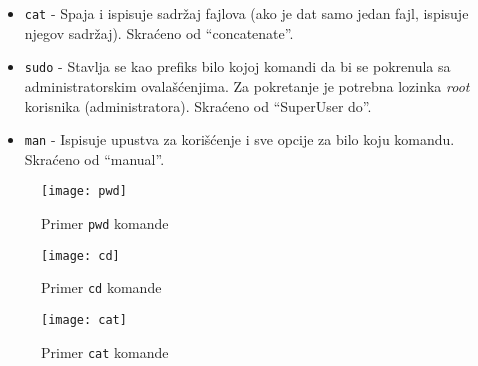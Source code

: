 \begin{itemize}
\item \texttt{cat} 	- Spaja i ispisuje sadržaj fajlova (ako je dat samo jedan fajl, ispisuje njegov sadržaj). Skraćeno od ``concatenate''.

\item \texttt{sudo} - Stavlja se kao prefiks bilo kojoj komandi da bi se pokrenula sa administratorskim ovalašćenjima. Za pokretanje je potrebna lozinka \textit{root} korisnika (administratora). Skraćeno od ``SuperUser do''.

\item \texttt{man} - Ispisuje upustva za korišćenje i sve opcije za bilo koju komandu. Skraćeno od ``manual''.
\end{itemize}
\begin{figure}[H]
	\centering
	\texttt{[image: pwd]}
	\caption{Primer \texttt{pwd} komande}
\end{figure}
\begin{figure}[H]
	\centering
	\texttt{[image: cd]}
	\caption{Primer \texttt{cd} komande}
\end{figure}
\begin{figure}[H]
	\centering
	\texttt{[image: cat]}
	\caption{Primer \texttt{cat} komande}
\end{figure}
